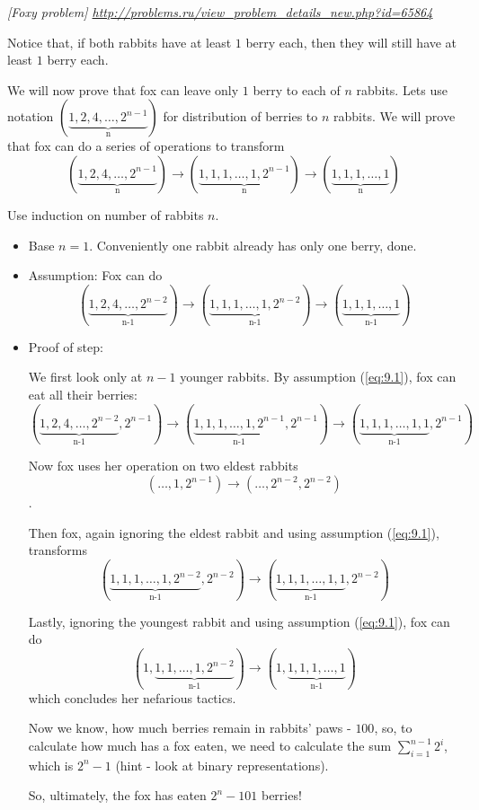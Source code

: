 \begin{problem}
\textit{[Foxy problem] \url{http://problems.ru/view_problem_details_new.php?id=65864}}

Notice that, if both rabbits have at least $1$ berry each, then they will still have at least $1$ berry each. 

We will now prove that fox can leave only $1$ berry to each of $n$ rabbits. Lets use notation $(\underbrace{1,2,4,\dots,2^{n-1}}_\text{n})$ for distribution of berries to $n$ rabbits. We will prove that fox can do a series of operations to transform $$(\underbrace{1,2,4,\dots,2^{n-1}}_\text{n}) \to (\underbrace{1,1,1,\dots,1,2^{n-1}}_\text{n}) \to (\underbrace{1,1,1,\dots,1}_\text{n}) $$

Use induction on number of rabbits $n$.
\begin{itemize}
\item Base $n=1$. Conveniently one rabbit already has only one berry, done.
\item Assumption: Fox can do  
\begin{equation}\label{eq:9.1}
(\underbrace{1,2,4,\dots,2^{n-2}}_\text{n-1}) \to (\underbrace{1,1,1,\dots,1,2^{n-2}}_\text{n-1}) \to (\underbrace{1,1,1,\dots,1}_\text{n-1})
\end{equation}
\item Proof of step: 

We first look only at $n-1$ younger rabbits. By assumption (\ref{eq:9.1}), fox can eat all their berries: $$(\underbrace{1,2,4,\dots,2^{n-2}}_\text{n-1},2^{n-1}) \to (\underbrace{1,1,1,\dots,1,2^{n-1}}_\text{n-1},2^{n-1}) \to (\underbrace{1,1,1,\dots,1,1}_\text{n-1},2^{n-1}) $$

Now fox uses her operation on two eldest rabbits $$(\dots,1,2^{n-1}) \to (\dots,2^{n-2},2^{n-2})$$.

Then fox, again ignoring the eldest rabbit and using assumption (\ref{eq:9.1}), transforms  $$(\underbrace{1,1,1,\dots,1,2^{n-2}}_\text{n-1},2^{n-2}) \to (\underbrace{1,1,1,\dots,1,1}_\text{n-1},2^{n-2}) $$

Lastly, ignoring the youngest rabbit and using assumption  (\ref{eq:9.1}), fox can do  $$(1,\underbrace{1,1,\dots,1,2^{n-2}}_\text{n-1}) \to (1,\underbrace{1,1,1,\dots,1}_\text{n-1}) $$ which concludes her nefarious tactics.

Now we know, how much berries remain in rabbits' paws - $100$, so, to calculate how much has a fox eaten, we need to calculate the sum $\sum_{i=1}^{n-1}{2^i}$, which is $2^n-1$ (hint - look at binary representations).

So, ultimately, the fox has eaten $2^n-101$ berries!
\end{itemize}
\end{problem}
%



